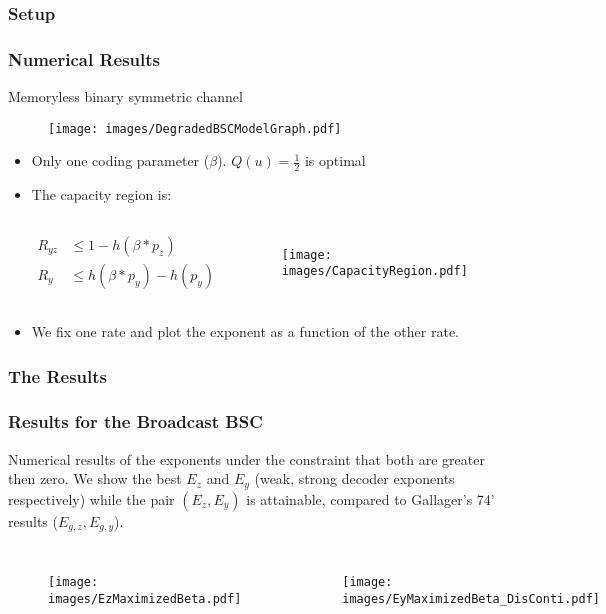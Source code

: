 \documentclass[mathserif]{beamer}
\begin{document}
\subsubsection*{Setup}
\begin{frame}
\frametitle{Numerical Results}
\begin{block}{}
Memoryless binary symmetric channel
\end{block}
\begin{figure}
\centering
\texttt{[image: images/DegradedBSCModelGraph.pdf]}
\end{figure}
\pause
\begin{itemize}
\item Only one coding parameter ($\beta$). $Q(u) = \frac 1 2$ is optimal
\pause
\item The capacity region is:
\begin{columns}[c] %
\begin{align*}
    R_{yz} &\le 1-h(\beta\ast p_z)\\
    R_y &\le h(\beta\ast p_y)-h(p_y)
\end{align*}
\begin{figure}[htp]
\centering
\texttt{[image: images/CapacityRegion.pdf]}
\end{figure}
\end{columns}
\item We fix one rate and plot the exponent as a function of the other rate.
\end{itemize}
\end{frame}


\subsubsection*{The Results}
\begin{frame}
\frametitle{Results for the Broadcast BSC}
\begin{block}{}
Numerical results of the exponents under the constraint that both are greater then zero. We show the best $E_z
$ and $E_y$ (weak, strong decoder exponents respectively) while the pair $(E_z,E_y)$ is attainable, compared to Gallager's 74' results ($E_{g,z}, E_{g,y}$).
\end{block}
\begin{columns}[c] %


\begin{figure}[htp]
\centering
\texttt{[image: images/EzMaximizedBeta.pdf]} \label{fig:EzMaxBeta}
\end{figure}

\begin{figure}[htp]
\texttt{[image: images/EyMaximizedBeta\_DisConti.pdf]}\label{fig:EyMaxBeta}
\end{figure}

\end{columns}
\end{frame}
\end{document}
